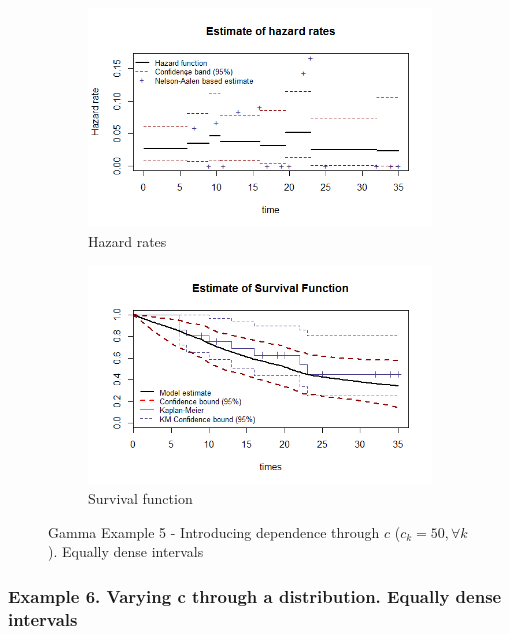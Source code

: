 \documentclass[letterpaper]{article}\usepackage[]{graphicx}\usepackage[]{xcolor}
\begin{document}
\begin{figure}
  \centering
  \begin{subfigure}[a]{\textwidth}\centering
    \includegraphics[width=\textwidth]{G51.png}
    \caption{Hazard rates}
  \end{subfigure}
  \begin{subfigure}[b]{\textwidth}\centering
    \includegraphics[width=\textwidth]{G52.png}
    \caption{Survival function}
  \end{subfigure}
  \caption{Gamma Example 5 - Introducing dependence through $c$ ($c_k=50, \forall k$). Equally dense intervals}
  \label{fig:G5}
\end{figure}

\subsubsection{Example 6. Varying c through a distribution. Equally dense intervals}
\end{document}
